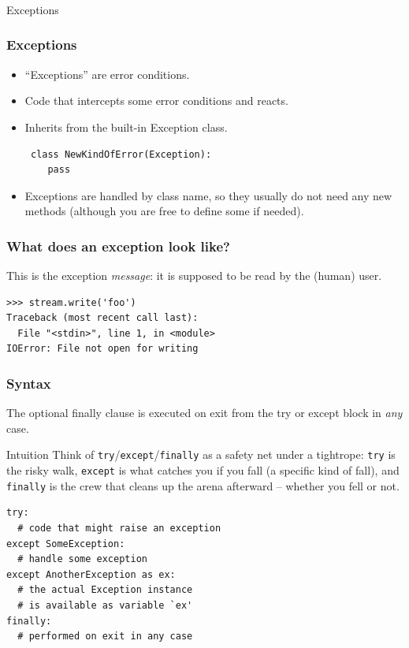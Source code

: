 \begin{frame}[fragile]\frametitle{}
\begin{center}
{\Large Exceptions}
\end{center}
\end{frame}


\begin{frame}[fragile]\frametitle{Exceptions}

\begin{itemize}
\item ``Exceptions'' are error conditions.
\item Code that intercepts some error conditions and
  reacts.
\item  Inherits from the built-in  Exception class.

\begin{lstlisting}
 class NewKindOfError(Exception):
    pass
 \end{lstlisting}

\item
   Exceptions are handled by class name, so they usually do not need
   any new methods (although you are free to define some if needed).

\end{itemize}
\end{frame}

\begin{frame}[fragile] \frametitle{What does an exception look like?}
  This is the exception \emph{message}: it is supposed to be read
  by the (human) user.
\begin{lstlisting}
>>> stream.write('foo')
Traceback (most recent call last):
  File "<stdin>", line 1, in <module>
IOError: File not open for writing
\end{lstlisting}
\end{frame}

\begin{frame}[fragile]\frametitle{Syntax}
  The optional finally clause is executed on exit from the
  try or except block in \emph{any} case.
\begin{block}{Intuition}
Think of \texttt{try}/\texttt{except}/\texttt{finally} as a safety net under a tightrope: \texttt{try} is the risky walk, \texttt{except} is what catches you if you fall (a specific kind of fall), and \texttt{finally} is the crew that cleans up the arena afterward -- whether you fell or not.
\end{block}
\begin{lstlisting}
try:
  # code that might raise an exception
except SomeException:
  # handle some exception
except AnotherException as ex:
  # the actual Exception instance
  # is available as variable `ex'
finally:
  # performed on exit in any case
\end{lstlisting}
\end{frame}


